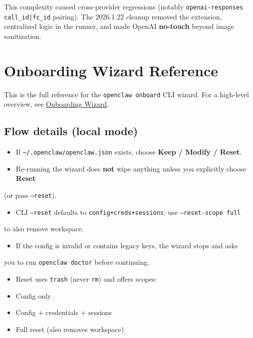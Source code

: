 This complexity caused cross-provider regressions (notably \texttt{openai-responses}
\texttt{call\_id|fc\_id} pairing). The 2026.1.22 cleanup removed the extension, centralized
logic in the runner, and made OpenAI \textbf{no-touch} beyond image sanitization.


\clearpage

\section{Onboarding Wizard Reference}


This is the full reference for the \texttt{openclaw onboard} CLI wizard.
For a high-level overview, see \href{/start/wizard}{Onboarding Wizard}.

\subsection{Flow details (local mode)}


\begin{itemize}
  \item If \texttt{\textasciitilde{}/.openclaw/openclaw.json} exists, choose \textbf{Keep / Modify / Reset}.
  \item Re-running the wizard does \textbf{not} wipe anything unless you explicitly choose \textbf{Reset}
\end{itemize}

(or pass \texttt{--reset}).
\begin{itemize}
  \item CLI \texttt{--reset} defaults to \texttt{config+creds+sessions}; use \texttt{--reset-scope full}
\end{itemize}

to also remove workspace.
\begin{itemize}
  \item If the config is invalid or contains legacy keys, the wizard stops and asks
\end{itemize}

you to run \texttt{openclaw doctor} before continuing.
\begin{itemize}
  \item Reset uses \texttt{trash} (never \texttt{rm}) and offers scopes:
  \item Config only
  \item Config + credentials + sessions
  \item Full reset (also removes workspace)
\end{itemize}

